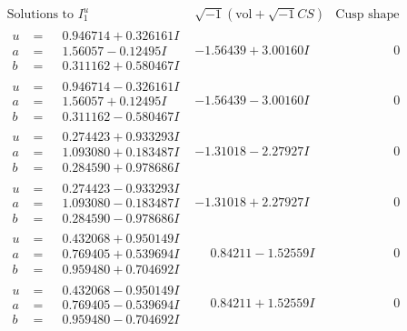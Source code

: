 \documentclass[1p]{elsarticle_modified}
\theoremstyle{definition}
\newcommand{\I}{\sqrt{-1}}
\begin{document}
$$\begin{array}{c|c|c}  
\text{Solutions to }I^u_{1}& \I (\text{vol} + \sqrt{-1}CS) & \text{Cusp shape}\\
 \hline 
\begin{aligned}
u &= \phantom{-}0.946714 + 0.326161 I \\
a &= \phantom{-}1.56057 - 0.12495 I \\
b &= \phantom{-}0.311162 + 0.580467 I\end{aligned}
 & -1.56439 + 3.00160 I & \phantom{-0.000000 } 0 \\ \hline\begin{aligned}
u &= \phantom{-}0.946714 - 0.326161 I \\
a &= \phantom{-}1.56057 + 0.12495 I \\
b &= \phantom{-}0.311162 - 0.580467 I\end{aligned}
 & -1.56439 - 3.00160 I & \phantom{-0.000000 } 0 \\ \hline\begin{aligned}
u &= \phantom{-}0.274423 + 0.933293 I \\
a &= \phantom{-}1.093080 + 0.183487 I \\
b &= \phantom{-}0.284590 + 0.978686 I\end{aligned}
 & -1.31018 - 2.27927 I & \phantom{-0.000000 } 0 \\ \hline\begin{aligned}
u &= \phantom{-}0.274423 - 0.933293 I \\
a &= \phantom{-}1.093080 - 0.183487 I \\
b &= \phantom{-}0.284590 - 0.978686 I\end{aligned}
 & -1.31018 + 2.27927 I & \phantom{-0.000000 } 0 \\ \hline\begin{aligned}
u &= \phantom{-}0.432068 + 0.950149 I \\
a &= \phantom{-}0.769405 + 0.539694 I \\
b &= \phantom{-}0.959480 + 0.704692 I\end{aligned}
 & \phantom{-}0.84211 - 1.52559 I & \phantom{-0.000000 } 0 \\ \hline\begin{aligned}
u &= \phantom{-}0.432068 - 0.950149 I \\
a &= \phantom{-}0.769405 - 0.539694 I \\
b &= \phantom{-}0.959480 - 0.704692 I\end{aligned}
 & \phantom{-}0.84211 + 1.52559 I & \phantom{-0.000000 } 0 \\ \hline\begin{aligned}

\end{aligned}
\end{array}$$
\end{document}
